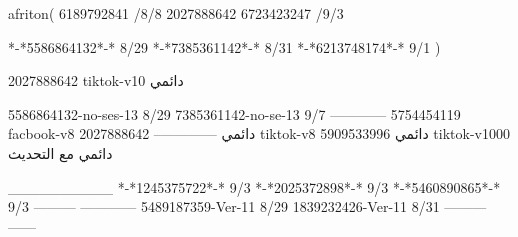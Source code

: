 afriton(
6189792841 /8/8
2027888642
6723423247 /9/3

*-*5586864132*-* 8/29
*-*7385361142*-* 8/31
*-*6213748174*-* 9/1
)

2027888642 tiktok-v10
دائمي

5586864132-no-ses-13
8/29
7385361142-no-se-13
9/7
------------
5754454119 facbook-v8
دائمي
--------------
2027888642 tiktok-v8
دائمي
5909533996 tiktok-v1000
دائمي مع التحديث

__________
*-*1245375722*-* 9/3
*-*2025372898*-* 9/3
*-*5460890865*-* 9/3
---------
------------
5489187359-Ver-11
8/29
1839232426-Ver-11
8/31
---------
------
